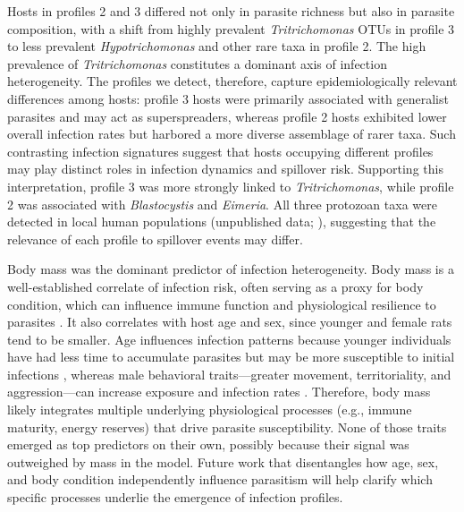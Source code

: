 \documentclass[oneside, a4paper, onecolumn, 11pt]{article}
\begin{document}
Hosts in profiles 2 and 3 differed not only in parasite richness but also in parasite composition, with a shift from highly prevalent \textit{Tritrichomonas} OTUs in profile 3 to less prevalent \textit{Hypotrichomonas} and other rare taxa in profile 2. The high prevalence of \textit{Tritrichomonas} constitutes a dominant axis of infection heterogeneity. The profiles we detect, therefore, capture epidemiologically relevant differences among hosts: profile 3 hosts were primarily associated with generalist parasites and may act as superspreaders, whereas profile 2 hosts exhibited lower overall infection rates but harbored a more diverse assemblage of rarer taxa. Such contrasting infection signatures suggest that hosts occupying different profiles may play distinct roles in infection dynamics and spillover risk. Supporting this interpretation, profile 3 was more strongly linked to \textit{Tritrichomonas}, while profile 2 was associated with \textit{Blastocystis} and \textit{Eimeria}. All three protozoan taxa were detected in local human populations (unpublished data; \citep{Barrett2024-nc}), suggesting that the relevance of each profile to spillover events may differ.

Body mass was the dominant predictor of infection heterogeneity. Body mass is a well-established correlate of infection risk, often serving as a proxy for body condition, which can influence immune function and physiological resilience to parasites \citep{Sanchez2018-tf}. It also correlates with host age and sex, since younger and female rats tend to be smaller. Age influences infection patterns because younger individuals have had less time to accumulate parasites but may be more susceptible to initial infections \citep{Santin2023-yk}, whereas male behavioral traits---greater movement, territoriality, and aggression---can increase exposure and infection rates \citep{Grear2009-ch}. Therefore, body mass likely integrates multiple underlying physiological processes (e.g., immune maturity, energy reserves) that drive parasite susceptibility. None of those traits emerged as top predictors on their own, possibly because their signal was outweighed by mass in the model. Future work that disentangles how age, sex, and body condition independently influence parasitism will help clarify which specific processes underlie the emergence of infection profiles.
\end{document}
